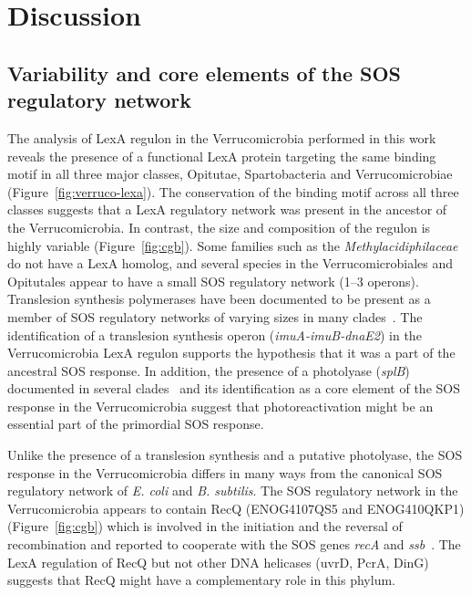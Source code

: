 \section{Discussion}

\subsection{Variability and core elements of the SOS regulatory network}
The analysis of LexA regulon in the Verrucomicrobia performed in this work
reveals the presence of a functional LexA protein targeting the same binding
motif in all three major classes, Opitutae, Spartobacteria and Verrucomicrobiae
(Figure~\ref{fig:verruco-lexa}). The conservation of the binding motif across
all three classes suggests that a LexA regulatory network was present in the
ancestor of the Verrucomicrobia. In contrast, the size and composition of the
regulon is highly variable (Figure~\ref{fig:cgb}). Some families such as
the \textit{Methylacidiphilaceae} do not have a LexA homolog, and several species
in the Verrucomicrobiales and Opitutales appear to have a small SOS regulatory
network (1--3 operons). Translesion synthesis polymerases have been
documented to be present as a member of SOS regulatory networks of varying
sizes in many clades~\citep{erill2007aeons, davis2002definition,
  fernandez2000identification, sanchez2015sos, ulrich2013characterization,
  au2005genetic}. The identification of a translesion synthesis operon
(\textit{imuA-imuB-dnaE2}) in the Verrucomicrobia LexA regulon supports the
hypothesis that it was a part of the ancestral SOS response. In addition, the
presence of a photolyase (\textit{splB}) documented in several
clades~\citep{davis2002definition, cirz2006defining, sanchez2012analysis,
  ulrich2013characterization, sanchez2015sos} and its identification as a core
element of the SOS response in the
Verrucomicrobia suggest that photoreactivation might be an essential part of
the primordial SOS response.

Unlike the presence of a translesion synthesis and a putative photolyase, the
SOS response in the Verrucomicrobia differs in many ways from the canonical SOS
regulatory network of \textit{E. coli} and \textit{B. subtilis}. The SOS
regulatory network in the Verrucomicrobia appears to contain RecQ (ENOG4107QS5
and ENOG410QKP1) (Figure~\ref{fig:cgb}) which is involved in the initiation and
the reversal of recombination and reported to cooperate with the SOS genes
\textit{recA} and \textit{ssb}~\citep{heyer2004damage,
  nakayama2005escherichia}. The LexA regulation of RecQ but not other DNA
helicases (uvrD, PcrA, DinG) suggests that RecQ might have a complementary
role in this phylum.

